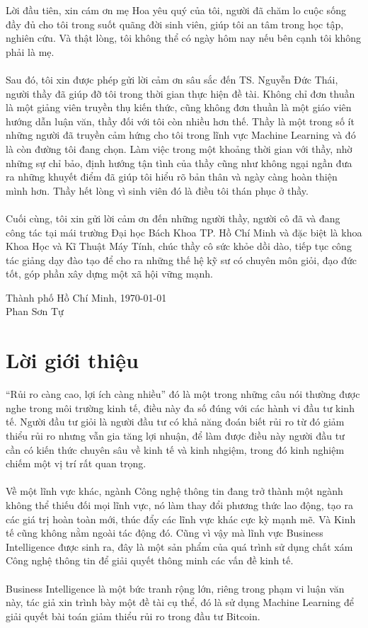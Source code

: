 Lời đầu tiên, xin cám ơn mẹ Hoa yêu quý của tôi, người đã chăm lo cuộc
sống đầy đủ cho tôi trong suốt quãng đời sinh viên, giúp tôi an tâm trong học
tập, nghiên cứu. Và thật lòng, tôi không thể có ngày hôm nay nếu bên 
cạnh tôi không phải là mẹ.\\\\
Sau đó, tôi xin được phép gửi lời cảm ơn sâu sắc đến TS. Nguyễn Đức Thái,
người thầy đã giúp đỡ tôi trong thời gian thực hiện đề tài.
Không chỉ đơn thuần là một giảng viên truyền thụ kiến thức, cũng không đơn thuần
là một giáo viên hướng dẫn luận văn, thầy đối với tôi còn nhiều hơn thế. Thầy là
một trong số ít những người đã truyền cảm hứng cho tôi trong lĩnh vực Machine
Learning và đó là còn đường tôi đang chọn. Làm việc trong một khoảng thời gian
với thầy, nhờ những sự chỉ bảo, định hướng tận tình của thầy cũng như không
ngại ngần đưa ra những khuyết điểm đã giúp tôi hiểu rõ bản thân và ngày càng hoàn thiện mình hơn.
Thầy hết lòng vì sinh viên đó là điều tôi thán phục ở thầy.\\\\
Cuối cùng, tôi xin gửi lời cảm ơn đến những người thầy, người cô đã và đang công tác
tại mái trường Đại học Bách Khoa TP. Hồ Chí Minh và đặc biệt là khoa Khoa Học và
Kĩ Thuật Máy Tính, chúc thầy cô sức khỏe dồi dào, tiếp tục công tác giảng dạy
đào tạo để cho ra những thế hệ kỹ sư có chuyên môn giỏi, đạo đức tốt, góp phần
 xây dựng một xã hội vững mạnh.
 \vspace{2cm}
 \begin{flushright}
 Thành phố Hồ Chí Minh, \MakeLowercase{\today}\\ 
Phan Sơn Tự\\
 \end{flushright}
\pagebreak

\section*{Lời giới thiệu}
\thispagestyle{plain} 
``Rủi ro càng cao, lợi ích càng nhiều'' đó là một trong những câu nói thường
được nghe trong môi trường kinh tế, điều này đa số đúng với các hành vi đầu tư
kinh tế. Người đầu tư giỏi là người đầu tư có khả năng đoán biết rủi ro từ đó
giảm thiểu rủi ro nhưng vẫn gia tăng lợi nhuận, để làm được điều này người
đầu tư cần có kiến thức chuyên sâu về kinh tế và kinh nhgiệm, trong đó kinh 
nghiệm chiếm một vị trí rất quan trọng.\\\\
Về một lĩnh vực khác, ngành Công nghệ thông tin đang trở thành một ngành không 
thể thiếu đối mọi lĩnh vực, nó làm thay đổi phương thức lao động, tạo ra các 
giá trị hoàn toàn mới, thúc đẩy các lĩnh vực khác cực kỳ mạnh mẽ. Và Kinh tế 
cũng không nằm ngoài tác động đó. Cũng vì vậy mà lĩnh vực Business Intelligence
được sinh ra, đây là một sản phẩm của quá trình sử dụng chất xám Công nghệ 
thông tin để giải quyết thông minh các vấn đề kinh tế.\\\\
Business Intelligence là một bức tranh rộng lớn, riêng trong phạm vi luận văn 
này, tác giả xin trình bày một đề tài cụ thể, đó là sử dụng Machine Learning để 
giải quyết bài toán giảm thiểu rủi ro trong đầu tư Bitcoin.
\pagebreak